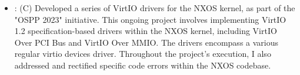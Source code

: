 \documentclass[zh]{resume}
\begin{document}


\begin{itemize}
	\item {}:
	(C)
Developed a series of VirtIO drivers for the NXOS kernel, as part of the "OSPP 2023" initiative. This ongoing project involves implementing VirtIO 1.2 specification-based drivers within the NXOS kernel, including VirtIO Over PCI Bus and VirtIO Over MMIO. The drivers encompass a various regular virtio devices driver. Throughout the project's execution, I also addressed and rectified specific code errors within the NXOS codebase.
\end{itemize}
\end{document}

